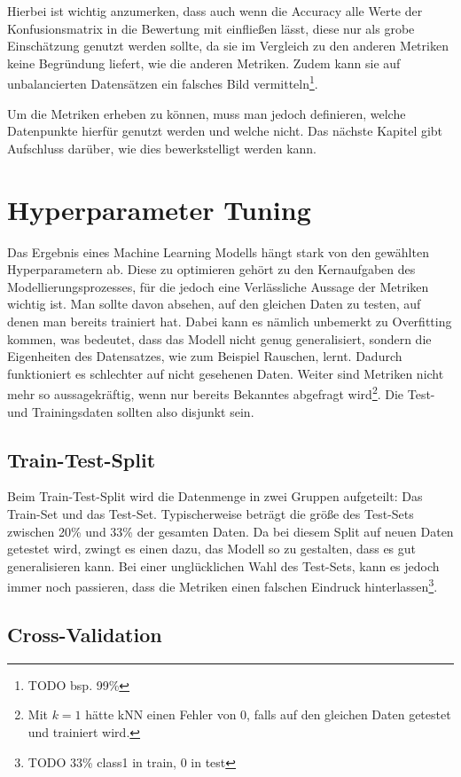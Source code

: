 Hierbei ist wichtig anzumerken, dass auch wenn die Accuracy alle Werte der Konfusionsmatrix in die Bewertung
 mit einfließen lässt, diese nur als grobe Einschätzung genutzt werden sollte, da sie im Vergleich zu den anderen
 Metriken keine Begründung liefert, wie die anderen Metriken. Zudem kann sie auf unbalancierten Datensätzen ein
 falsches Bild vermitteln\footnote{TODO bsp. 99\%}.

Um die Metriken erheben zu können, muss man jedoch definieren, welche Datenpunkte hierfür genutzt werden
 und welche nicht. Das nächste Kapitel gibt Aufschluss darüber, wie dies bewerkstelligt werden kann.


\section{Hyperparameter Tuning}

Das Ergebnis eines Machine Learning Modells hängt stark von den gewählten Hyperparametern ab. Diese zu
 optimieren gehört zu den Kernaufgaben des Modellierungsprozesses, für die jedoch eine Verlässliche Aussage
 der Metriken wichtig ist. Man sollte davon absehen, auf den gleichen Daten zu testen, auf denen man bereits
 trainiert hat. Dabei kann es nämlich unbemerkt zu Overfitting kommen, was bedeutet, dass das Modell nicht
 genug generalisiert, sondern die Eigenheiten des Datensatzes, wie zum Beispiel Rauschen, lernt. Dadurch
 funktioniert es schlechter auf nicht gesehenen Daten. Weiter sind Metriken nicht mehr so aussagekräftig,
 wenn nur bereits Bekanntes abgefragt wird\footnote{Mit $k=1$ hätte kNN einen Fehler von $0$, falls auf den
 gleichen Daten getestet und trainiert wird.}. Die Test- und Trainingsdaten sollten also disjunkt sein.

\subsection*{Train-Test-Split}

Beim Train-Test-Split wird die Datenmenge in zwei Gruppen aufgeteilt: Das Train-Set und das Test-Set.
 Typischerweise beträgt die größe des Test-Sets zwischen 20\% und 33\% der gesamten Daten. Da bei diesem Split
 auf neuen Daten getestet wird, zwingt es einen dazu, das Modell so zu gestalten, dass es gut generalisieren
 kann. Bei einer unglücklichen Wahl des Test-Sets, kann es jedoch immer noch passieren, dass die Metriken
 einen falschen Eindruck hinterlassen\footnote{TODO 33\% class1 in train, 0 in test}.

\subsection*{Cross-Validation}

